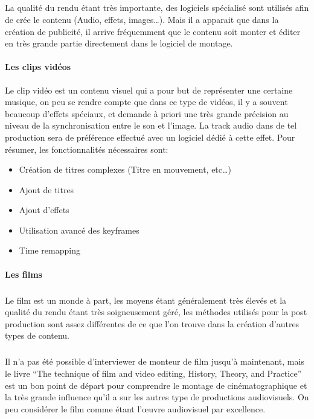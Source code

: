 \subparagraph{}
La qualité du rendu étant très importante, des logiciels spécialisé sont utilisés
afin de crée le contenu (Audio, effets, images\ldots). Mais il a apparait que dans
la création de publicité, il arrive fréquemment que le contenu soit monter et
éditer en très grande partie directement dans le logiciel de montage.

\paragraph {Les clips vidéos}
Le clip vidéo est un contenu visuel qui a pour but de représenter
une certaine musique, on peu se rendre compte que dans ce type de
vidéos, il y a souvent beaucoup d'effets spéciaux, et demande à
priori une très grande précision au niveau de la synchronisation
entre le son et l'image. La track audio dans de tel production
sera de préférence effectué avec un logiciel dédié à cette
effet. Pour résumer, les fonctionnalités nécessaires sont:
\begin{itemize}
  \item{Création de titres complexes (Titre en mouvement, etc\ldots)}
  \item{Ajout de titres}
  \item{Ajout d'effets}
  \item{Utilisation avancé des keyframes}
  \item{Time remapping}
\end{itemize}

\paragraph {Les films}
\subparagraph{}
Le film est un monde à part, les moyens étant généralement très élevés et la
qualité du rendu étant très soigneusement géré, les méthodes utilisés
pour la post production sont assez différentes de ce que l'on trouve dans la
création d'autres types de contenu.

\subparagraph{}
Il n'a pas été possible d'interviewer de monteur de film jusqu'à maintenant, mais
le livre ``The technique of film and video editing, History, Theory, and Practice''
\cite{TheTechniqueOfFilmAndVideoEditing} est un bon point de départ pour
comprendre le montage de cinématographique et la très grande influence qu'il a
sur les autres type de productions audiovisuels. On peu considérer le film comme
étant l'œuvre audiovisuel par excellence. %


